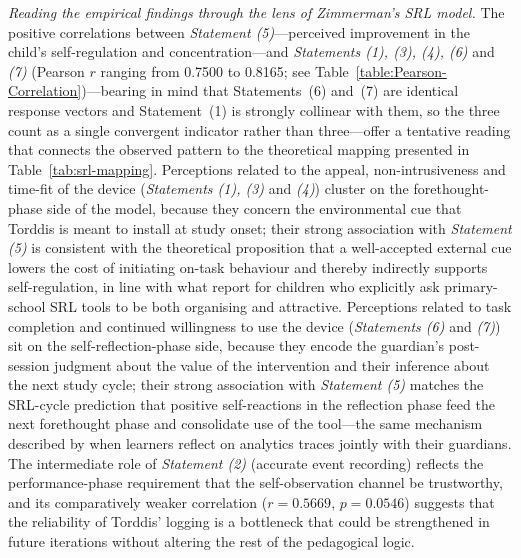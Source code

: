 \textit{Reading the empirical findings through the lens of Zimmerman's SRL model.} The positive correlations between \textit{Statement (5)}---perceived improvement in the child's self-regulation and concentration---and \textit{Statements (1), (3), (4), (6)} and \textit{(7)} (Pearson $r$ ranging from 0.7500 to 0.8165; see Table~\ref{table:Pearson-Correlation})---bearing in mind that Statements~(6) and~(7) are identical response vectors and Statement~(1) is strongly collinear with them, so the three count as a single convergent indicator rather than three---offer a tentative reading that connects the observed pattern to the theoretical mapping presented in Table~\ref{tab:srl-mapping}. Perceptions related to the appeal, non-intrusiveness and time-fit of the device (\textit{Statements (1), (3)} and \textit{(4)}) cluster on the forethought-phase side of the model, because they concern the environmental cue that Torddis is meant to install at study onset; their strong association with \textit{Statement (5)} is consistent with the theoretical proposition that a well-accepted external cue lowers the cost of initiating on-task behaviour and thereby indirectly supports self-regulation, in line with what \citet{Amaefule2025Childrens} report for children who explicitly ask primary-school SRL tools to be both organising and attractive. Perceptions related to task completion and continued willingness to use the device (\textit{Statements (6)} and \textit{(7)}) sit on the self-reflection-phase side, because they encode the guardian's post-session judgment about the value of the intervention and their inference about the next study cycle; their strong association with \textit{Statement (5)} matches the SRL-cycle prediction that positive self-reactions in the reflection phase feed the next forethought phase and consolidate use of the tool---the same mechanism described by \citet{Kleimola2025Promoting} when learners reflect on analytics traces jointly with their guardians. The intermediate role of \textit{Statement (2)} (accurate event recording) reflects the performance-phase requirement that the self-observation channel be trustworthy, and its comparatively weaker correlation ($r=0.5669$, $p=0.0546$) suggests that the reliability of Torddis' logging is a bottleneck that could be strengthened in future iterations without altering the rest of the pedagogical logic.

